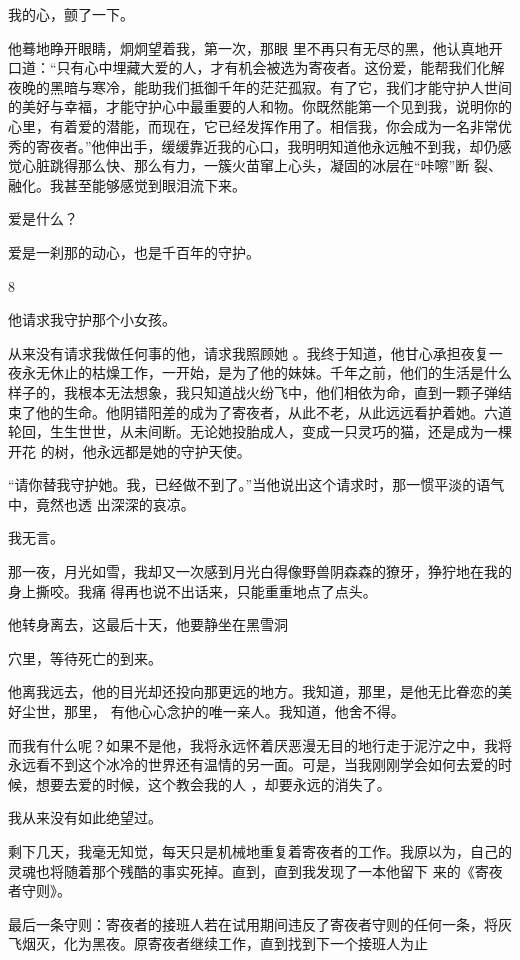 \documentclass{article}
\begin{document}
我的心，颤了一下。 

他蓦地睁开眼睛，炯炯望着我，第一次，那眼
\newpage
里不再只有无尽的黑，他认真地开口道：“只有心中埋藏大爱的人，才有机会被选为寄夜者。这份爱，能帮我们化解夜晚的黑暗与寒冷，能助我们抵御千年的茫茫孤寂。有了它，我们才能守护人世间的美好与幸福，才能守护心中最重要的人和物。你既然能第一个见到我，说明你的心里，有着爱的潜能，而现在，它已经发挥作用了。相信我，你会成为一名非常优秀的寄夜者。”他伸出手，缓缓靠近我的心口，我明明知道他永远触不到我，却仍感觉心脏跳得那么快、那么有力，一簇火苗窜上心头，凝固的冰层在“咔嚓”断
裂、融化。我甚至能够感觉到眼泪流下来。 


爱是什么？ 


爱是一刹那的动心，也是千百年的守护。 


8 


他请求我守护那个小女孩。 

从来没有请求我做任何事的他，请求我照顾她
\newpage
。我终于知道，他甘心承担夜复一夜永无休止的枯燥工作，一开始，是为了他的妹妹。千年之前，他们的生活是什么样子的，我根本无法想象，我只知道战火纷飞中，他们相依为命，直到一颗子弹结束了他的生命。他阴错阳差的成为了寄夜者，从此不老，从此远远看护着她。六道轮回，生生世世，从未间断。无论她投胎成人，变成一只灵巧的猫，还是成为一棵开花
的树，他永远都是她的守护天使。 

“请你替我守护她。我，已经做不到了。”当他说出这个请求时，那一惯平淡的语气中，竟然也透
出深深的哀凉。 


我无言。 

那一夜，月光如雪，我却又一次感到月光白得像野兽阴森森的獠牙，狰狞地在我的身上撕咬。我痛
得再也说不出话来，只能重重地点了点头。 

他转身离去，这最后十天，他要静坐在黑雪洞

\newpage
穴里，等待死亡的到来。 

他离我远去，他的目光却还投向那更远的地方。我知道，那里，是他无比眷恋的美好尘世，那里，
有他心心念护的唯一亲人。我知道，他舍不得。 

而我有什么呢？如果不是他，我将永远怀着厌恶漫无目的地行走于泥泞之中，我将永远看不到这个冰冷的世界还有温情的另一面。可是，当我刚刚学会如何去爱的时候，想要去爱的时候，这个教会我的人
，却要永远的消失了。 


我从来没有如此绝望过。 

剩下几天，我毫无知觉，每天只是机械地重复着寄夜者的工作。我原以为，自己的灵魂也将随着那个残酷的事实死掉。直到，直到我发现了一本他留下
来的《寄夜者守则》。 

最后一条守则：寄夜者的接班人若在试用期间违反了寄夜者守则的任何一条，将灰飞烟灭，化为黑夜。原寄夜者继续工作，直到找到下一个接班人为止
\newpage
\end{document}

